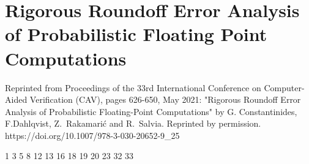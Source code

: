 
\chapter{Rigorous Roundoff Error Analysis of Probabilistic Floating Point Computations}
\label{sec:cav}
Reprinted from Proceedings of the 33rd International Conference on Computer-Aided Verification (CAV), pages 626-650, May 2021: "Rigorous Roundoff Error Analysis of Probabilistic Floating-Point Computations" by G. Constantinides, F.Dahlqvist, Z.~Rakamari\'c and R.~Salvia. Reprinted by permission.\\
https://doi.org/10.1007/978-3-030-20652-9\_25

\setupuuchapterbib

                              		{1}
					{3}
       								{5}
	{8}
						{12}
						{13}
       					{16}
										{18}
						{19}
										{20}
								{23}
						{32}
				{33}



%
%
